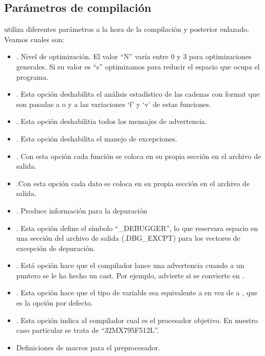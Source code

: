 \subsection{Parámetros de compilación}
 utiliza diferentes parámetros a la hora de la compilación y posterior enlazado. Veamos cuales son:\\

\begin{itemize}
	\item {}. Nivel de optimización. El valor ``N'' varía entre 0 y 3 para optimizaciones generales. Si su valor es ``s'' optimizamos para reducir el espacio que ocupa el programa.
	\item {}. Esta opción deshabilita el análisis estadístico de las cadenas con format que son pasadas a  o  y a las variaciones `f' y `v' de estas funciones.
	\item {}. Esta opción deshabilitia todos los mensajes de advertencia.
	\item {}. Esta opción deshabilita el manejo de excepciones.
	\item {}. Con esta opción cada función se coloca en su propia sección en el archivo de salida.
	\item {}.Con esta opción cada dato se coloca en su propia sección en el archivo de salida.
	\item {}. Produce información para la depuración
	\item {}. Esta opción define el símbolo ``\_DEBUGGER'', lo que reservara espacio en una sección del archivo de salida (.DBG\_EXCPT) para los vectores de excepción de depuración.
	\item {}. Está opción hace que el compilador lance una advertencia cuando a un puntero se le ha hecho un cast. Por ejemplo, advierte si  se convierte en .
	\item {}. Esta opción hace que el tipo de variable  sea equivalente a  en vez de a , que es la opción por defecto.
	\item {}. Esta opción indica al compilador cual es el procesador objetivo. En nuestro caso particular se trata de ``32MX795F512L''.
	\item Definiciones de macros para el preprocesador.

\end{itemize}
